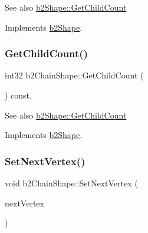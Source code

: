 \begin{DoxySeeAlso}{See also}
\hyperlink{classb2Shape_a05a3c445017d96df9238ceefe6ce37ab}{b2\+Shape\+::\+Get\+Child\+Count} 
\end{DoxySeeAlso}


Implements \hyperlink{classb2Shape_a05a3c445017d96df9238ceefe6ce37ab}{b2\+Shape}.

\mbox{\label{classb2ChainShape_a4d4fd8f5386a30f35b10d1b2848dbe54}} 
\subsubsection{\texorpdfstring{Get\+Child\+Count()}{GetChildCount()}\hspace{0.1cm}{\footnotesize\ttfamily [2/2]}}
{\footnotesize\ttfamily int32 b2\+Chain\+Shape\+::\+Get\+Child\+Count (\begin{DoxyParamCaption}{ }\end{DoxyParamCaption}) const\hspace{0.3cm}{\ttfamily [override]}, {\ttfamily [virtual]}}

\begin{DoxySeeAlso}{See also}
\hyperlink{classb2Shape_a05a3c445017d96df9238ceefe6ce37ab}{b2\+Shape\+::\+Get\+Child\+Count} 
\end{DoxySeeAlso}


Implements \hyperlink{classb2Shape_a05a3c445017d96df9238ceefe6ce37ab}{b2\+Shape}.

\mbox{\label{classb2ChainShape_a15c7c2821a52266ef57621ac7d34a95f}} 
\subsubsection{\texorpdfstring{Set\+Next\+Vertex()}{SetNextVertex()}\hspace{0.1cm}{\footnotesize\ttfamily [1/2]}}
{\footnotesize\ttfamily void b2\+Chain\+Shape\+::\+Set\+Next\+Vertex (\begin{DoxyParamCaption}\item[{const \hyperlink{structb2Vec2}{b2\+Vec2} \&}]{next\+Vertex }\end{DoxyParamCaption})}

